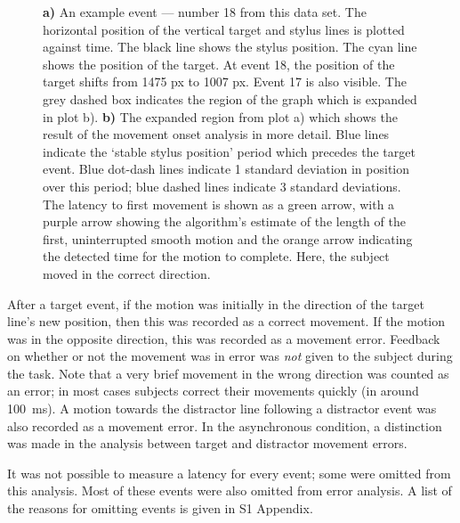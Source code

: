 \documentclass[10pt,letterpaper]{article}
\begin{document}
\begin{figure}[htb!]
\centering
\caption[Obtaining the latency, method 1] {\textbf{a)} An example
  event --- number 18 from this data set. The horizontal position of
  the vertical target and stylus lines is plotted against time. The
  black line shows the stylus position. The cyan line shows the
  position of the target. At event 18, the position of the target
  shifts from 1475 px to 1007 px. Event 17 is also visible. The grey
  dashed box indicates the region of the graph which is expanded in
  plot b). \textbf{b)} The expanded region from plot a) which shows
  the result of the movement onset analysis in more detail. Blue lines
  indicate the `stable stylus position' period which precedes the
  target event. Blue dot-dash lines indicate 1 standard deviation in
  position over this period; blue dashed lines indicate 3 standard
  deviations. The latency to first movement is shown as a green arrow,
  with a purple arrow showing the algorithm's estimate of the length
  of the first, uninterrupted smooth motion and the orange arrow
  indicating the detected time for the motion to complete. Here, the
  subject moved in the correct direction.}
\label{example_event}
\end{figure}

After a target event, if the motion was initially in the direction of
the target line's new position, then this was recorded as a correct
movement. If the motion was in the opposite direction, this was
recorded as a movement error. Feedback on whether or not the movement
was in error was \emph{not} given to the subject during the task. Note
that a very brief movement in the wrong direction was counted as an
error; in most cases subjects correct their movements quickly (in
around 100~ms). A motion towards the distractor line following a
distractor event was also recorded as a movement error. In the
asynchronous condition, a distinction was made in the analysis between
target and distractor movement errors.

It was not possible to measure a latency for every event; some were
omitted from this analysis. Most of these events were also omitted
from error analysis.
A list of the reasons for omitting events is given in S1 Appendix.
\end{document}
